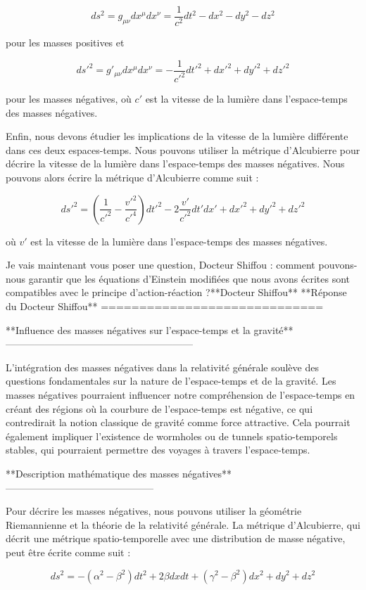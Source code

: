 $$ds^2 = g_{\mu\nu}dx^\mu dx^\nu = \frac{1}{c^2}dt^2 - dx^2 - dy^2 - dz^2$$

pour les masses positives et

$$ds'^2 = g'_{\mu\nu}dx^\mu dx^\nu = -\frac{1}{c'^2}dt'^2 + dx'^2 + dy'^2 + dz'^2$$

pour les masses négatives, où $c'$ est la vitesse de la lumière dans l'espace-temps des masses négatives.

Enfin, nous devons étudier les implications de la vitesse de la lumière différente dans ces deux espaces-temps. Nous pouvons utiliser la métrique d'Alcubierre pour décrire la vitesse de la lumière dans l'espace-temps des masses négatives. Nous pouvons alors écrire la métrique d'Alcubierre comme suit :

$$ds'^2 = \left(\frac{1}{c'^2} - \frac{v'^2}{c'^4}\right)dt'^2 - 2\frac{v'}{c'^2}dt'dx' + dx'^2 + dy'^2 + dz'^2$$

où $v'$ est la vitesse de la lumière dans l'espace-temps des masses négatives.

Je vais maintenant vous poser une question, Docteur Shiffou : comment pouvons-nous garantir que les équations d'Einstein modifiées que nous avons écrites sont compatibles avec le principe d'action-réaction ?**Docteur Shiffou**
**Réponse du Docteur Shiffou**
=============================

**Influence des masses négatives sur l'espace-temps et la gravité**
---------------------------------------------------------

L'intégration des masses négatives dans la relativité générale soulève des questions fondamentales sur la nature de l'espace-temps et de la gravité. Les masses négatives pourraient influencer notre compréhension de l'espace-temps en créant des régions où la courbure de l'espace-temps est négative, ce qui contredirait la notion classique de gravité comme force attractive. Cela pourrait également impliquer l'existence de wormholes ou de tunnels spatio-temporels stables, qui pourraient permettre des voyages à travers l'espace-temps.

**Description mathématique des masses négatives**
---------------------------------------------

Pour décrire les masses négatives, nous pouvons utiliser la géométrie Riemannienne et la théorie de la relativité générale. La métrique d'Alcubierre, qui décrit une métrique spatio-temporelle avec une distribution de masse négative, peut être écrite comme suit :

$$ds^2 = -\left(\alpha^2 - \beta^2\right)dt^2 + 2\beta dx dt + \left(\gamma^2 - \beta^2\right)dx^2 + dy^2 + dz^2$$

